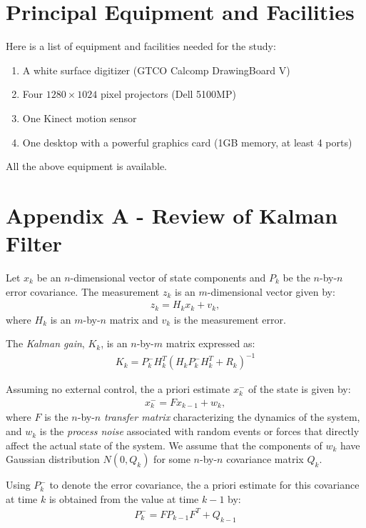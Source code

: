 \section{Principal Equipment and Facilities}
Here is a list of equipment and facilities needed for the study:

\begin{enumerate}
  \item A white surface digitizer (GTCO Calcomp DrawingBoard V)
  \item Four $1280\times1024$ pixel projectors (Dell 5100MP)
  \item One Kinect motion sensor
  \item One desktop with a powerful graphics card (1GB memory, at least 4 ports)
\end{enumerate}

All the above equipment is available.

\section{Appendix A - Review of Kalman Filter}
Let $x_k$ be an $n$-dimensional vector of state components and $P_k$ be the
$n$-by-$n$ error covariance. The measurement $z_k$ is an $m$-dimensional
vector given by:
\begin{align*}
z_k = H_kx_k + v_k,
\end{align*}
where $H_k$ is an $m$-by-$n$ matrix and $v_k$ is the measurement error.

The \textit{Kalman gain}, $K_k$, is an $n$-by-$m$ matrix expressed as:
\begin{align*}
K_k = P_k^-H_k^T(H_kP_k^-H_k^T + R_k)^{-1}
\end{align*}

Assuming no external control, the a priori estimate $x_k^-$ of the state is
given by:
\begin{align*}
x_k^- = Fx_{k - 1} + w_k,
\end{align*}
where $F$ is the $n$-by-$n$ \textit{transfer matrix} characterizing the
dynamics of the system, and $w_k$ is the \textit{process noise} associated with
random events or forces that directly affect the actual state of the system. We assume that the components of $w_k$
have Gaussian distribution $N(0, Q_k)$ for some $n$-by-$n$ covariance matrix
$Q_k$.

Using $P_k^-$ to denote the error covariance, the a priori estimate for this
covariance at time $k$ is obtained from the value at time $k - 1$ by:
\begin{align*}
P_k^- = FP_{k - 1}F^T + Q_{k - 1}
\end{align*}

